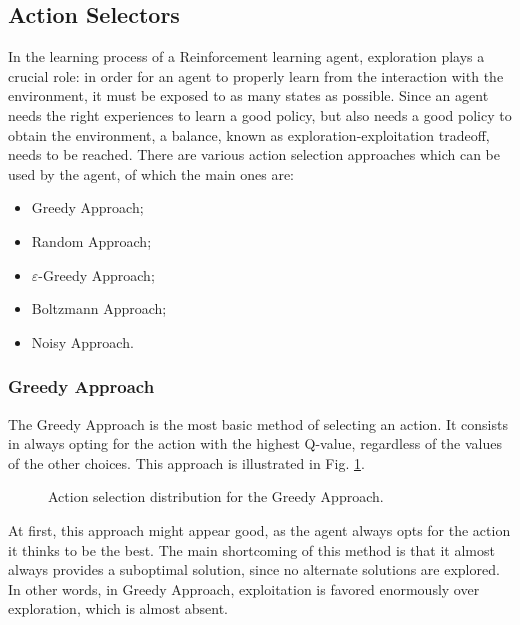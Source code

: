 \documentclass[a4paper, 12pt]{article}
\numberwithin{equation}{section}
\begin{document}
\subsection{Action Selectors}
In the learning process of a Reinforcement learning agent, exploration \cite{action-selectors} plays a crucial role: in order for an agent to properly learn from the interaction with the environment, it must be exposed to as many states as possible. Since an agent needs the right experiences to learn a good policy, but also needs a good policy to obtain the environment, a balance, known as exploration-exploitation tradeoff, needs to be reached. There are various action selection approaches which can be used by the agent, of which the main ones are:
\begin{itemize}
	\item Greedy Approach;
	\item Random Approach;
	\item $\varepsilon$-Greedy Approach;
	\item Boltzmann Approach;
	\item Noisy Approach.
\end{itemize}


\subsubsection{Greedy Approach}

The Greedy Approach is the most basic method of selecting an action. It consists in always opting for the action with the highest Q-value, regardless of the values of the other choices. This approach is illustrated in Fig. \ref{fig:greedy}.

\begin{figure}[h]
	\centering
		\caption{Action selection distribution for the Greedy Approach.}
	\label{fig:greedy}
\end{figure}

At first, this approach might appear good, as the agent always opts for the action it thinks to be the best. The main shortcoming of this method is that it almost always provides a suboptimal solution, since no alternate solutions are explored. In other words, in Greedy Approach, exploitation is favored enormously over exploration, which is almost absent. 
\end{document}
